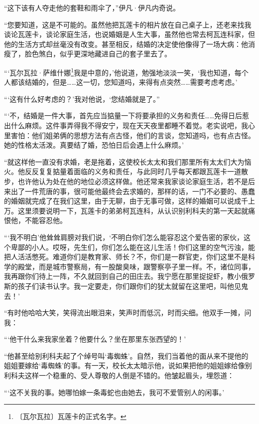 \documentclass[12pt,UTF-8,openany]{ctexbook}
\begin{document}
\begin{normalsize}
    “这下该有人夺走他的套鞋和雨伞了，”伊凡·伊凡内奇说。
    
    “您要知道，这是不可能的。虽然他把瓦莲卡的相片放在自己桌子上，还老来找我谈论瓦莲卡，谈论家庭生活，也说婚姻是人生大事，虽然他也常去柯瓦连科家，但他的生活方式却丝毫没有改变。甚至相反，结婚的决定使他像得了一场大病：他消瘦了，脸色煞白，似乎更深地藏进自己的套子里去了。
    
    “‘瓦尔瓦拉·萨维什娜\footnote{〔瓦尔瓦拉〕瓦莲卡的正式名字。}我是中意的，’他说道，勉强地淡淡一笑，‘我也知道，每个人都该结婚的，但是……这一切，您知道吗，来得有点突然……需要考虑考虑。’
    
    “‘这有什么好考虑的？’我对他说，‘您结婚就是了。”
    
    “‘不，结婚是一件大事，首先应当掂量一下将要承担的义务和责任……免得日后惹出什么麻烦。这件事弄得我不得安宁，现在天天夜里都睡不着觉。老实说吧，我心里害怕：他们姐弟俩的思想方法有点古怪，他们的言谈，您知道吗，也有点古怪。她的性格太活泼。真要结了婚，恐怕日后会遇上什么麻烦。’
    
    “就这样他一直没有求婚，老是拖着，这使校长太太和我们那里所有太太们大为恼火。他反反复复掂量着面临的义务和责任，与此同时几乎每天都跟瓦莲卡一道散步，也许他认为处在他的地位必须这样做。他还常来我家谈论家庭生活，若不是后来出了一件荒唐的事，很可能他最终会去求婚的，那样的话，一门不必要的、愚蠢的婚姻就完成了在我们这里，由于无聊，由于无事可做，这样的婚姻可以说成千上万。这里须要说明一下，瓦莲卡的弟弟柯瓦连科，从认识别利科夫的第一天起就痛恨他，不能容忍他。
    
    “‘我不明白’他耸耸肩膀对我们说，‘不明白你们怎么能容忍这个爱告密的家伙，这个卑鄙的小人。哎呀，先生们，你们怎么能在这儿生活！你们这里的空气污浊，能把人活活憋死。难道你们是教育家、师长？不，你们是一群官吏，你们这里不是科学的殿堂，而是城市警察局，有一股酸臭味，跟警察亭子里一样。不，诸位同事，我再跟你们待上一阵，不久就回到自己的田庄去。我宁愿在那里捉捉虾，教小俄罗斯的孩子们读书认字。我一定要走，你们跟你们的犹太就留在这里吧，叫他见鬼去！’
    
    “有时他哈哈大笑，笑得流出眼泪来，笑声时而低沉，时而尖细。他双手一摊，问我：
    
    “‘他干什么来我家坐着？他要什么？坐在那里东张西望的！’
    
    “他甚至给别利科夫起了个绰号叫‘毒蜘蛛’。自然，我们当着他的面从来不提他的姐姐要嫁给‘毒蜘蛛’的事。有一天，校长太太暗示他，说如果把他的姐姐嫁给像别利科夫这样一个稳重的、受人尊敬的人倒是不错的。他皱起眉头，埋怨道：
    
    “‘这不关我的事。她哪怕嫁一条毒蛇也由她去，我可不爱管别人的闲事。’
    

\end{normalsize}
\end{document}
